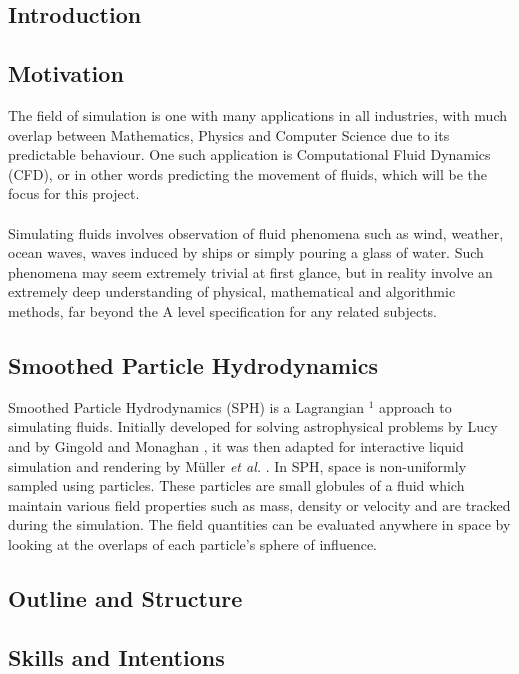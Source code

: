 \documentclass[a4paper,11pt]{article}
\begin{document}
\begin{multicols}{2}
\section{Introduction}
\subsection{Motivation}
The field of simulation is one with many applications in all industries, with much overlap between Mathematics, Physics and Computer Science due to its predictable behaviour. One such application is Computational Fluid Dynamics (CFD), or in other words predicting the movement of fluids, which will be the focus for this project.
\\~\\
\indent Simulating fluids involves observation of fluid phenomena such as wind, weather, ocean waves, waves induced by ships or simply pouring a glass of water. Such phenomena may seem extremely trivial at first glance, but in reality involve an extremely deep understanding of physical, mathematical and algorithmic methods, far beyond the A level specification for any related subjects.
\subsection{Smoothed Particle Hydrodynamics}
Smoothed Particle Hydrodynamics (SPH) is a Lagrangian $^1$ approach to simulating fluids. Initially developed for solving astrophysical problems by Lucy \cite{lucy} and by Gingold and Monaghan \cite{gingold}, it was then adapted for interactive liquid simulation and rendering by M{\"u}ller \textit{et al.} \cite{muller}. In SPH, space is non-uniformly sampled using particles. These particles are small globules of a fluid which maintain various field properties such as mass, density or velocity and are tracked during the simulation. The field quantities can be evaluated anywhere in space by looking at the overlaps of each particle's sphere of influence.
\nocite{*}
\subsection{Outline and Structure}
\subsection{Skills and Intentions}

\end{multicols}
\end{document}

